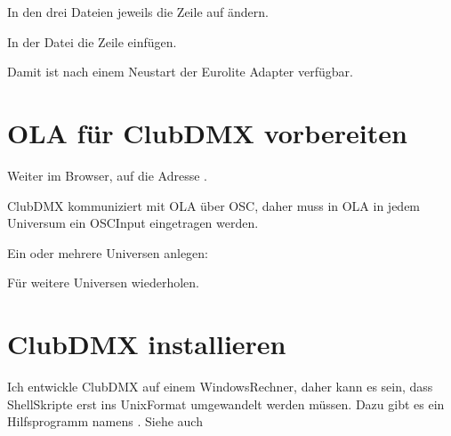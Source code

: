 \documentclass[letterpaper,10pt,ngerman]{sphinxmanual}
\begin{document}
In den drei Dateien
 jeweils die Zeile
 auf  ändern.

In der Datei  die Zeile 
einfügen.

Damit ist nach einem Neustart der Eurolite Adapter verfügbar.


\section{OLA für ClubDMX vorbereiten}
\label{\detokenize{raspberry:ola-fur-clubdmx-vorbereiten}}
Weiter im Browser, auf die Adresse .

ClubDMX kommuniziert mit OLA über OSC, daher muss in OLA in jedem Universum
ein OSC\sphinxhyphen{}Input eingetragen werden.

Ein oder mehrere Universen anlegen:

\begin{sphinxVerbatim}[commandchars=\\\{\}]
   
  
  
        
    
\end{sphinxVerbatim}

Für weitere Universen wiederholen.


\section{ClubDMX installieren}
\label{\detokenize{raspberry:clubdmx-installieren}}
Ich entwickle ClubDMX auf einem Windows\sphinxhyphen{}Rechner, daher kann es sein, dass
Shell\sphinxhyphen{}Skripte erst ins Unix\sphinxhyphen{}Format umgewandelt werden müssen. Dazu gibt es
ein Hilfsprogramm namens . Siehe auch
\end{document}
